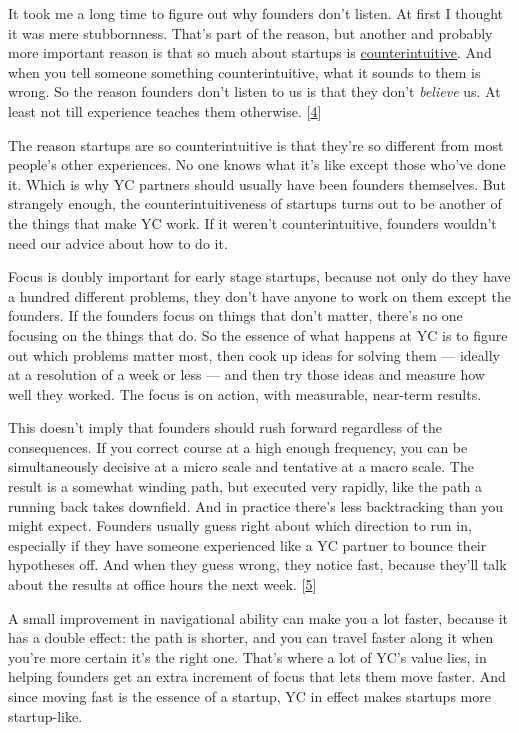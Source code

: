 It took me a long time to figure out why founders don't listen. At first
I thought it was mere stubbornness. That's part of the reason, but
another and probably more important reason is that so much about
startups is \href{before.html}{counterintuitive}. And when you tell
someone something counterintuitive, what it sounds to them is wrong. So
the reason founders don't listen to us is that they don't \emph{believe}
us. At least not till experience teaches them otherwise.
{[}\hyperref[f4n]{4}{]}

The reason startups are so counterintuitive is that they're so different
from most people's other experiences. No one knows what it's like except
those who've done it. Which is why YC partners should usually have been
founders themselves. But strangely enough, the counterintuitiveness of
startups turns out to be another of the things that make YC work. If it
weren't counterintuitive, founders wouldn't need our advice about how to
do it.

Focus is doubly important for early stage startups, because not only do
they have a hundred different problems, they don't have anyone to work
on them except the founders. If the founders focus on things that don't
matter, there's no one focusing on the things that do. So the essence of
what happens at YC is to figure out which problems matter most, then
cook up ideas for solving them --- ideally at a resolution of a week or
less --- and then try those ideas and measure how well they worked. The
focus is on action, with measurable, near-term results.

This doesn't imply that founders should rush forward regardless of the
consequences. If you correct course at a high enough frequency, you can
be simultaneously decisive at a micro scale and tentative at a macro
scale. The result is a somewhat winding path, but executed very rapidly,
like the path a running back takes downfield. And in practice there's
less backtracking than you might expect. Founders usually guess right
about which direction to run in, especially if they have someone
experienced like a YC partner to bounce their hypotheses off. And when
they guess wrong, they notice fast, because they'll talk about the
results at office hours the next week. {[}\hyperref[f5n]{5}{]}

A small improvement in navigational ability can make you a lot faster,
because it has a double effect: the path is shorter, and you can travel
faster along it when you're more certain it's the right one. That's
where a lot of YC's value lies, in helping founders get an extra
increment of focus that lets them move faster. And since moving fast is
the essence of a startup, YC in effect makes startups more startup-like.

